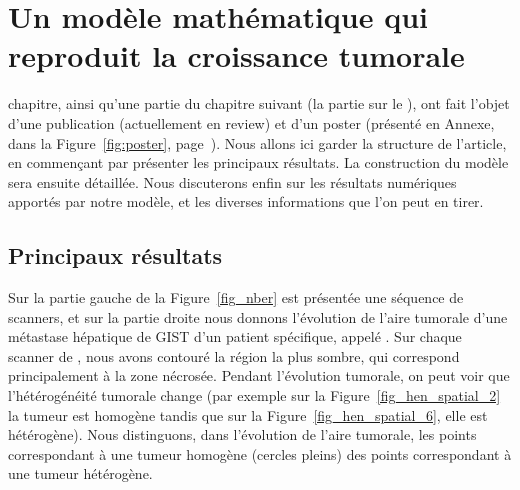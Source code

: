 \documentclass[main.tex]{subfiles}
\begin{document}
\chapter{Un modèle mathématique qui reproduit la croissance tumorale \label{chap:modele_EDP}}


 chapitre, ainsi qu'une partie du chapitre suivant (la partie sur le \twinweno), ont  fait l'objet d'une publication (actuellement en review) et d'un poster (présenté en Annexe, dans la Figure~\ref{fig:poster}, page~\pageref{fig:poster}). Nous allons ici garder la structure de l'article, en commençant par présenter les principaux résultats. La construction du modèle sera ensuite détaillée. Nous discuterons enfin sur les résultats numériques apportés par notre modèle, et les diverses informations que l'on peut en tirer.

\section{Principaux résultats}
Sur la partie gauche de la Figure~\ref{fig_nber} est présentée une séquence de scanners, et sur la partie droite nous donnons l'évolution de l'aire tumorale d'une métastase hépatique de GIST d'un patient spécifique, appelé \Nber. Sur chaque scanner de \Nber, nous avons contouré la région la plus sombre, qui correspond principalement à la zone nécrosée.  
Pendant l'évolution tumorale, on peut voir que l'hétérogénéité tumorale change (par exemple sur la Figure~\ref{fig_hen_spatial_2} la tumeur est homogène tandis que sur la Figure~\ref{fig_hen_spatial_6}, elle est hétérogène). Nous distinguons, dans l'évolution de l'aire tumorale,  les points correspondant à une tumeur homogène (cercles pleins) des points correspondant à une tumeur hétérogène.
\end{document}
